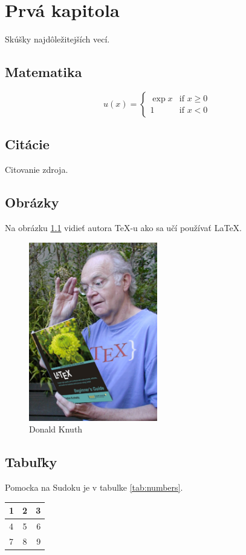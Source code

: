 \chapter{Prvá kapitola}
Skúšky najdôležitejších vecí.

\section{Matematika}
\[
u(x) =
  \begin{cases}
   \exp{x} & \text{if } x \geq 0 \\
   1       & \text{if } x < 0
  \end{cases}
\]

\section{Citácie}
Citovanie \citep{blackholes} zdroja.

\section{Obrázky}
Na obrázku \ref{fig:obrazok} vidieť autora \TeX-u ako sa učí používať \LaTeX.
\begin{figure}[h]
    \centering
    \includegraphics[width=0.5\textwidth]{knuth}
    \caption{Donald Knuth}
    \label{fig:obrazok}
\end{figure}
    
\section{Tabuľky}
Pomocka na Sudoku je v tabulke \ref{tab:numbers}.
\begin{center}
     \label{tab:numbers} 
    \begin{tabular}{l | c | r}
        1 & 2 & 3 \\ \hline
        4 & 5 & 6 \\ \hline
        7 & 8 & 9
    \end{tabular}
\end{center}

